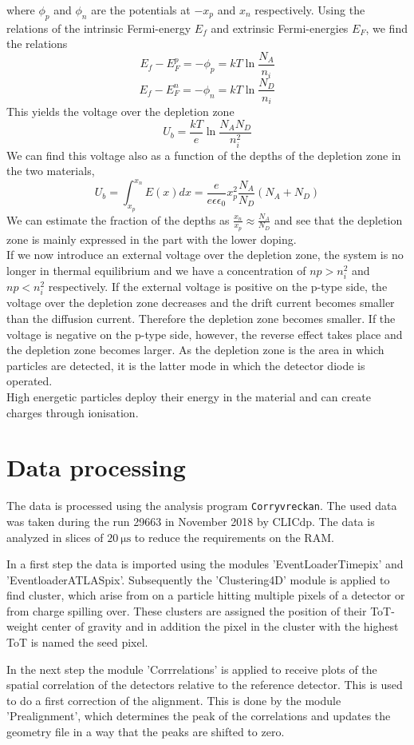 \documentclass[twocolumn,DIV=14,a4paper,biblatex, 10pt]{scrartcl}
\begin{document}
where $\phi_p$ and $\phi_n$ are the potentials at $-x_p$ and $x_n$ respectively. Using the relations of the intrinsic Fermi-energy $E_f$ and extrinsic Fermi-energies $E_F$, we find the relations
$$E_f-E_F^p=-\phi_p=kT\ln{\frac{N_A}{n_i}}$$
$$E_f-E_F^n=-\phi_n=kT\ln{\frac{N_D}{n_i}}$$
This yields the voltage over the depletion zone
$$U_b=\frac{kT}{e}\ln{\frac{N_A N_D}{n_i^2}}$$
We can find this voltage also as a function of the depths of the depletion zone in the two materials,
$$U_b = \int_{x_p}^{x_n}E(x)dx=\frac{e}{e\epsilon \epsilon_0}x_p^2 \frac{N_A}{N_D}(N_A+N_D)$$
We can estimate the fraction of the depths as $\frac{x_n}{x_p}\approx \frac{N_A}{N_D}$ and see that the depletion zone is mainly expressed in the part with the lower doping.\\
If we now introduce an external voltage over the depletion zone, the system is no longer in thermal equilibrium and we have a concentration of $np >n_i^2$ and $np<n_i^2$ respectively. If the external voltage is positive on the p-type side, the voltage over the depletion zone decreases and the drift current becomes smaller than the diffusion current. Therefore the depletion zone becomes smaller. If the voltage is negative on the p-type side, however, the reverse effect takes place and the depletion zone becomes larger. As the depletion zone is the area in which particles are detected, it is the latter mode in which the detector diode is operated.\\
High energetic particles deploy their energy in the material and can create charges through ionisation. 


\section{Data processing}
The data is processed using the analysis program \texttt{Corryvreckan}. The used data was taken during the run 29663 in November 2018 by CLICdp. The data is analyzed in slices of $\SI{20}{\micro\second}$ to reduce the requirements on the RAM.

In a first step the data is imported using the modules 'EventLoaderTimepix' and 'EventloaderATLASpix'. Subsequently the 'Clustering4D' module is applied to find cluster, which arise from on a particle hitting multiple pixels of a detector or from charge spilling over. These clusters are assigned the position of their ToT-weight center of gravity and in addition the pixel in the cluster with the highest ToT is named the seed pixel.

In the next step the module 'Corrrelations' is applied to receive plots of the spatial correlation of the detectors relative to the reference detector. This is used to do a first correction of the alignment. This is done by the module 'Prealignment', which determines the peak of the correlations and updates the geometry file in a way that the peaks are shifted to zero.
\end{document}
